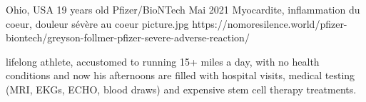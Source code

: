           {Ohio, USA}
          {19 years old}
          {Pfizer/BioNTech}
          {Mai 2021}
          {Myocardite, inflammation du coeur, douleur sévère au coeur
          }
          {picture.jpg}
          {https://nomoresilence.world/pfizer-biontech/greyson-follmer-pfizer-severe-adverse-reaction/}
          {

lifelong athlete, accustomed to running 15+ miles a day, with no health
conditions and now his afternoons are filled with hospital visits, medical
testing (MRI, EKGs, ECHO, blood draws) and expensive stem cell therapy
treatments.

}
